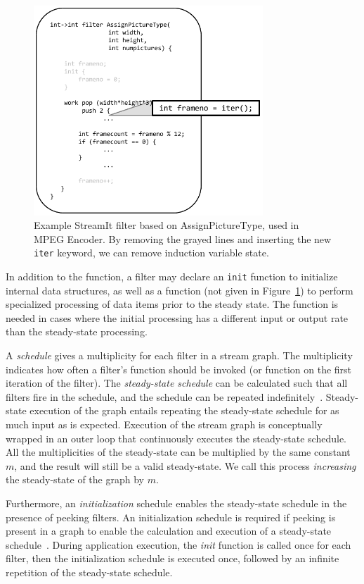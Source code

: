 \begin{figure}[t]
\centering
\includegraphics[width=3.4in]{figures/streamit-filter-example.pdf}
\caption{Example StreamIt filter based on AssignPictureType, used in MPEG Encoder. By removing the grayed lines and inserting the new {\tt iter} keyword, we can remove induction variable state. \protect\label{fig:apt-pipeline}}
\end{figure}

In addition to the \work function, a filter may declare an {\tt init}
function to initialize internal data structures, as well as a 
 \prework function (not given in Figure~\ref{fig:apt-pipeline}) to
perform specialized processing of data items prior to the steady
state.  The \prework function is needed in cases where the initial
processing has a different input or output rate than the steady-state
processing.

A {\it schedule} gives a multiplicity for each filter in a stream
graph.  The multiplicity indicates how often a filter's \work function
should be invoked (or \prework function on the first iteration of the filter).  The
{\it steady-state schedule} can be calculated such that all filters
fire in the schedule, and the schedule can be repeated
indefinitely~\cite{lee87}.  Steady-state execution of the graph
entails repeating the steady-state schedule for as much input as is
expected.  Execution of the stream graph is conceptually wrapped in an
outer loop that continuously executes the steady-state schedule.  All
the multiplicities of the steady-state can be multiplied by the same
constant $m$, and the result will still be a valid steady-state.  We
call this process {\it increasing} the steady-state of the graph by
$m$.

Furthermore, an {\it initialization} schedule enables the steady-state
schedule in the presence of peeking filters.  An initialization
schedule is required if peeking is present in a graph to enable the
calculation and execution of a steady-state
schedule~\cite{karczmarek-lctes03}.  During application execution, the
{\it init} function is called once for each filter, then the
initialization schedule is executed once, followed by an infinite
repetition of the steady-state schedule.


